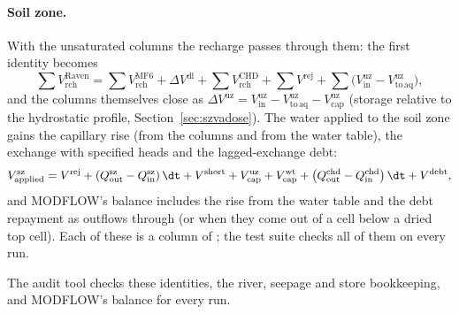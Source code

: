 \paragraph{Soil zone.}\label{sec:accsz2} With the unsaturated columns the recharge passes through them: the first identity
becomes
\begin{equation}
\sum V^{\mathrm{Raven}}_{\mathrm{rch}}=\sum V^{\mathrm{MF6}}_{\mathrm{rch}}+\Delta V^{\mathrm{dl}}+\sum V^{\mathrm{CHD}}_{\mathrm{rch}}+\sum V^{\mathrm{rej}}
+\sum\big(V^{\mathrm{uz}}_{\mathrm{in}}-V^{\mathrm{uz}}_{\mathrm{to\,aq}}\big),
\end{equation}
and the columns themselves close as
$\Delta V^{\mathrm{uz}}=V^{\mathrm{uz}}_{\mathrm{in}}-V^{\mathrm{uz}}_{\mathrm{to\,aq}}-V^{\mathrm{uz}}_{\mathrm{cap}}$ (storage relative to the
hydrostatic profile, Section~\ref{sec:szvadose}). The water applied to the soil zone gains the capillary rise (from the columns
and from the water table), the exchange with specified heads and the lagged-exchange debt:
\begin{equation}
V^{\mathrm{sz}}_{\mathrm{applied}}=V^{\mathrm{rej}}+\left(Q^{\mathrm{sz}}_{\mathrm{out}}-Q^{\mathrm{sz}}_{\mathrm{in}}\right)\dt+V^{\mathrm{short}}
+V^{\mathrm{uz}}_{\mathrm{cap}}+V^{\mathrm{wt}}_{\mathrm{cap}}+\left(Q^{\mathrm{chd}}_{\mathrm{out}}-Q^{\mathrm{chd}}_{\mathrm{in}}\right)\dt+V^{\mathrm{debt}},
\end{equation}
and MODFLOW's balance includes the rise from the water table and the debt repayment as outflows through
 (or  when they come out of a cell below a dried top cell). Each of these is a column of ; the test suite checks all of them on every run.

The audit tool checks these identities, the river, seepage and store bookkeeping, and MODFLOW's balance for every run.

